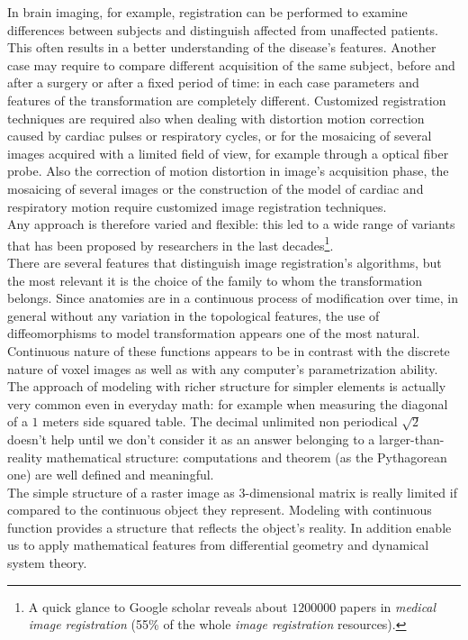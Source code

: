 %
%
In brain imaging, for example, registration can be performed to examine differences between subjects and distinguish affected from unaffected patients. This often results in a better understanding of the disease's features. Another case may require to compare different acquisition of the same subject, before and after a surgery or after a fixed period of time: in each case parameters and features of the transformation are completely different.
Customized registration techniques are required also when dealing with distortion motion correction caused by cardiac pulses or respiratory cycles, or for the mosaicing of several images acquired with a limited field of view, for example through a optical fiber probe.
Also the correction of motion distortion in image's acquisition phase, the mosaicing of several images or the construction of the model of cardiac and respiratory motion require customized image registration techniques.\\
Any approach is therefore varied and flexible: this led to a wide range of variants that has been proposed by researchers in the last decades\footnote{A quick glance to Google scholar reveals about $1200000$ papers in \emph{medical image registration} (55\% of the whole \emph{image registration} resources).}.\\
There are several features that distinguish image registration's algorithms, but the most relevant it is the choice of the family to whom the transformation belongs. Since anatomies are in a continuous process of modification over time, in general without any variation in the topological features, the use of diffeomorphisms to model transformation appears one of the most natural.\\
Continuous nature of these functions appears to be in contrast with the discrete nature of voxel images as well as with any computer's parametrization ability.\\
The approach of modeling with richer structure for simpler elements is actually very common even in everyday math: for example when measuring the diagonal of a $1$ meters side squared table. The decimal unlimited non periodical $\sqrt{2}$ doesn't help until we don't consider it as an answer belonging to a larger-than-reality mathematical structure: computations and theorem (as the Pythagorean one) are well defined and meaningful.\\ 
The simple structure of a raster image as 3-dimensional matrix is really limited if compared to the continuous object they represent. Modeling with continuous function provides a structure that reflects the object's reality. In addition enable us to apply mathematical features from differential geometry and dynamical system theory.\\
